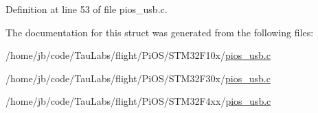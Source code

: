 \-Definition at line 53 of file pios\-\_\-usb.\-c.



\-The documentation for this struct was generated from the following files\-:\begin{DoxyCompactItemize}
\item 
/home/jb/code/\-Tau\-Labs/flight/\-Pi\-O\-S/\-S\-T\-M32\-F10x/\hyperlink{_s_t_m32_f10x_2pios__usb_8c}{pios\-\_\-usb.\-c}\item 
/home/jb/code/\-Tau\-Labs/flight/\-Pi\-O\-S/\-S\-T\-M32\-F30x/\hyperlink{_s_t_m32_f30x_2pios__usb_8c}{pios\-\_\-usb.\-c}\item 
/home/jb/code/\-Tau\-Labs/flight/\-Pi\-O\-S/\-S\-T\-M32\-F4xx/\hyperlink{_s_t_m32_f4xx_2pios__usb_8c}{pios\-\_\-usb.\-c}\end{DoxyCompactItemize}
